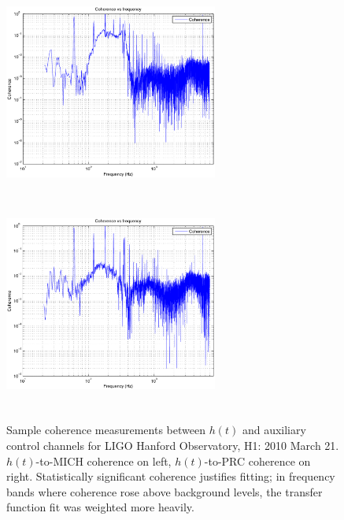 \begin{figure}
\begin{center}
\includegraphics[height=70mm, width=70mm]{figure2a.eps}
\includegraphics[height=70mm, width=70mm]{figure2b.eps}
\caption{Sample coherence measurements between $h(t)$ and auxiliary control channels for LIGO Hanford Observatory, H1: 2010 March 21. $h(t)$-to-MICH coherence on left, $h(t)$-to-PRC coherence on right. Statistically significant coherence justifies fitting; in frequency bands where coherence rose above background levels, the transfer function fit was weighted more heavily.}
\label{coherenceGraph}
\end{center}
\end{figure}
